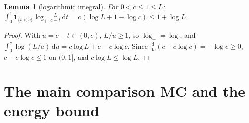 \documentclass[11pt]{article}
\newtheorem{lemma}[theorem]{Lemma}
\theoremstyle{definition}
\theoremstyle{remark}
\newcommand{\dd}{\,\mathrm d}
\newcommand{\logp}{\log_+}
\begin{document}
\begin{lemma}[logarithmic integral]\label{lem:logint}
For $0<c\le1\le L$: $\displaystyle\int_0^1\mathbf 1_{\{t<c\}}\logp\frac L{c-t}\dd t=c\,(\log L+1-\log c)\le1+\log L$.
\end{lemma}
\begin{proof}
With $u=c-t\in(0,c)$, $L/u\ge1$, so $\logp=\log$, and $\int_0^c\log(L/u)\dd u=c\log L+c-c\log c$.  Since $\frac{\mathrm d}{\mathrm dc}(c-c\log c)=-\log c\ge0$, $c-c\log c\le1$ on $(0,1]$, and $c\log L\le\log L$. 
\end{proof}

\section{The main comparison MC and the energy bound}\label{sec:MC}
\end{document}
